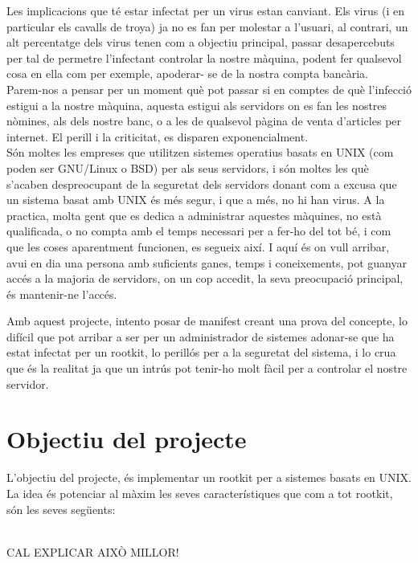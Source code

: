 \documentclass[a4paper]{article}
\begin{document}
Les implicacions que té estar infectat per un virus estan canviant. Els virus (i en particular
els cavalls de troya) ja no es fan per molestar a l'usuari, al contrari, un alt percentatge dels
virus tenen com a objectiu principal, passar desapercebuts per tal de permetre l'infectant
controlar la nostre màquina, podent fer qualsevol cosa en ella com per exemple, apoderar-
se de la nostra compta bancària.\\
Parem-nos a pensar per un moment què pot passar si en comptes de què l'infecció estigui
a la nostre màquina, aquesta estigui als servidors on es fan les nostres nòmines, als dels
nostre banc, o a les de qualsevol pàgina de venta d'articles per internet. El perill i la
criticitat, es disparen exponencialment.\\
Són moltes les empreses que utilitzen sistemes operatius basats en UNIX (com poden ser
GNU/Linux o BSD) per als seus servidors, i són moltes les què s'acaben despreocupant
de la seguretat dels servidors donant com a excusa que un sistema basat amb UNIX és
més segur, i que a més, no hi han virus. A la practica, molta gent que es dedica a
administrar aquestes màquines, no està qualificada, o no compta amb el temps necessari
per a fer-ho del tot bé, i com que les coses aparentment funcionen, es segueix així.
I aquí és on vull arribar, avui en dia una persona amb suficients ganes, temps i
coneixements, pot guanyar accés a la majoria de servidors, on un cop accedit, la seva
preocupació principal, és mantenir-ne l'accés.


Amb aquest projecte, intento posar de manifest creant una prova del concepte, lo difícil
que pot arribar a ser per un administrador de sistemes adonar-se que ha estat infectat per
un rootkit, lo perillós per a la seguretat del sistema, i lo crua que és la realitat ja que un
intrús pot tenir-ho molt fàcil per a controlar el nostre servidor.

\section{Objectiu del projecte}

L'objectiu del projecte, és implementar un rootkit per a sistemes basats en UNIX. La idea
és potenciar al màxim les seves característiques que com a tot rootkit, són les seves
següents:

\\
CAL EXPLICAR AIXÒ MILLOR!
\\
\\
\end{document}
